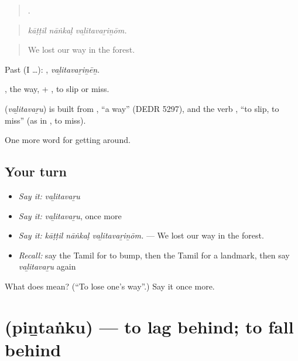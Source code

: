 \begin{quote}
  .
\end{quote}

\begin{quote}
\emph{kāṭṭil nāṅkaḷ vaḻitavaṟiṉōm.}
\end{quote}

\begin{quote}
We lost our way in the forest.
\end{quote}

Past (I …): , \emph{vaḻitavaṟiṉēṉ}.

, the way, + , to slip or miss.

\begin{cousinweb}
\textbf{} (\emph{vaḻitavaṟu}) is built from , \textquotedblleft{}a way\textquotedblright{} (DEDR 5297), and the verb , \textquotedblleft{}to slip, to miss\textquotedblright{} (as in , to miss).
\end{cousinweb}

\begin{grammarlens}[title={What you've built}]
One more word for getting around.
\end{grammarlens}

\subsection*{Your turn}
\begin{itemize}
\raggedright
  \item \emph{Say it:} \emph{vaḻitavaṟu}
  \item \emph{Say it:} \emph{vaḻitavaṟu}, once more
  \item \emph{Say it:} \emph{kāṭṭil nāṅkaḷ vaḻitavaṟiṉōm.} — We lost our way in the forest.
  \item \emph{Recall:} say the Tamil for to bump, then the Tamil for a landmark, then say \emph{vaḻitavaṟu} again
\end{itemize}

\begin{tcolorbox}[breakable,colback=teal!4,colframe=teal!35!black,title={Before you move on}]
What does  mean? (\textquotedblleft{}To lose one's way\textquotedblright{}.) Say it once more.
\end{tcolorbox}
\section[\texorpdfstring{\ta{பின்தங்கு} (piṉtaṅku)}{பின்தங்கு (piṉtaṅku)}]{ (piṉtaṅku) — to lag behind; to fall behind}

